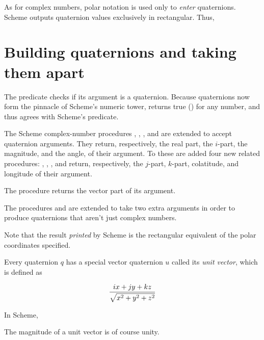 As for complex numbers, polar notation
is used only to {\em enter} quaternions.  Scheme outputs
quaternion values exclusively in rectangular.  Thus,


\section{Building quaternions and taking them apart}

The predicate  checks if its argument is
a quaternion.  Because quaternions now form the pinnacle of Scheme's
numeric tower,  returns true () for any
number, and thus agrees with Scheme's  predicate.

The Scheme complex-number procedures ,
, , and  are
extended to accept quaternion arguments.  They return,
respectively, the real part, the $i$-part, the magnitude,
and the angle, of their argument.  To these are
added four new related procedures: ,
, , and 
return, respectively, the $j$-part, $k$-part, colatitude, and
longitude of their argument.

The procedure  returns the vector part of its
argument.

The procedures  and
 are extended to take two extra arguments
in order to produce quaternions that aren't just complex numbers.


\n Note that the result {\em printed} by Scheme is the rectangular
equivalent of the polar coordinates specified.  

Every quaternion $q$ has a special vector quaternion $u$
called its {\em unit vector}, which is defined as

$$
{{ix + jy + kz} \over
\sqrt{x^2+y^2+z^2}
}
$$

\n In Scheme,


\n The magnitude of a unit vector is of course unity.


